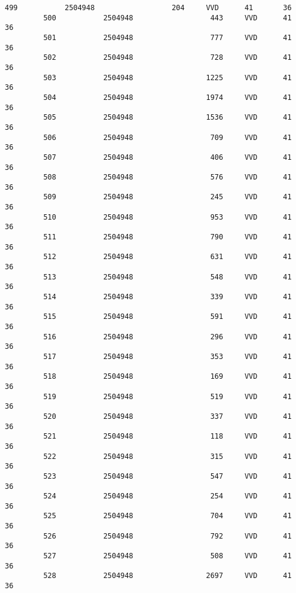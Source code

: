 \documentclass{article}
\begin{document}
\begin{Verbatim}[commandchars=\\\{\}]
         499           2504948                  204     VVD      41       36   
         500           2504948                  443     VVD      41       36   
         501           2504948                  777     VVD      41       36   
         502           2504948                  728     VVD      41       36   
         503           2504948                 1225     VVD      41       36   
         504           2504948                 1974     VVD      41       36   
         505           2504948                 1536     VVD      41       36   
         506           2504948                  709     VVD      41       36   
         507           2504948                  406     VVD      41       36   
         508           2504948                  576     VVD      41       36   
         509           2504948                  245     VVD      41       36   
         510           2504948                  953     VVD      41       36   
         511           2504948                  790     VVD      41       36   
         512           2504948                  631     VVD      41       36   
         513           2504948                  548     VVD      41       36   
         514           2504948                  339     VVD      41       36   
         515           2504948                  591     VVD      41       36   
         516           2504948                  296     VVD      41       36   
         517           2504948                  353     VVD      41       36   
         518           2504948                  169     VVD      41       36   
         519           2504948                  519     VVD      41       36   
         520           2504948                  337     VVD      41       36   
         521           2504948                  118     VVD      41       36   
         522           2504948                  315     VVD      41       36   
         523           2504948                  547     VVD      41       36   
         524           2504948                  254     VVD      41       36   
         525           2504948                  704     VVD      41       36   
         526           2504948                  792     VVD      41       36   
         527           2504948                  508     VVD      41       36   
         528           2504948                 2697     VVD      41       36   
         

\end{Verbatim}
\end{document}
